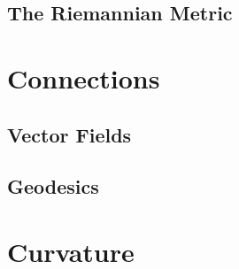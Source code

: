\documentclass[]{article}
\newcommand\<{\ensuremath{\left\langle}}
\renewcommand\>{\ensuremath{\right\rangle}}
\begin{document}
	\subsection*{The Riemannian Metric}
	
	\section{Connections}
	\subsection*{Vector Fields}
	\subsection*{Geodesics}
	
	\section{Curvature}
	
	
	
	
\end{document}
